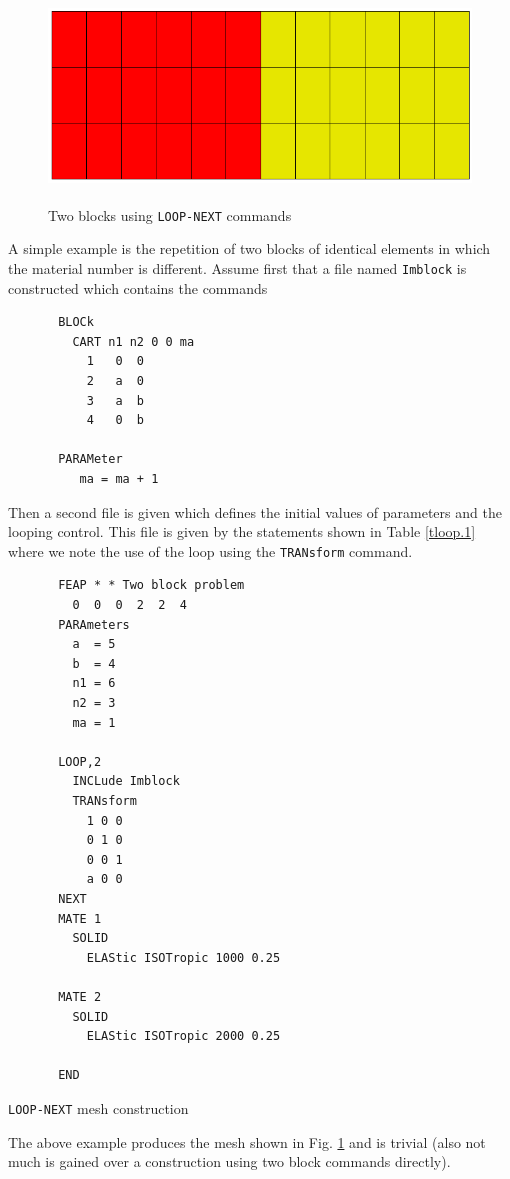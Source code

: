 \begin{figure}[hb!]
\centerline {\hfil \includegraphics[height=2.2in]{figs/lp2blk} \hfil}
\caption{Two blocks using \texttt{LOOP-NEXT} commands \label{floop0}}
\end{figure}
A simple example is the repetition of two blocks of identical elements
in which the material number is different.  Assume first that a file
named \texttt{Imblock} is constructed which contains the commands
\begin{verbatim}
       BLOCk
         CART n1 n2 0 0 ma
           1   0  0
           2   a  0
           3   a  b
           4   0  b

       PARAMeter
          ma = ma + 1

\end{verbatim}
Then a second file is given which defines the initial values of parameters
and the looping control.  This file is given by the statements shown in
Table \ref{tloop.1}
where we note the use of the loop using the \texttt{TRANsform} command.
\begin{table}[ht!]
\begin{center}
\begin{verbatim}
       FEAP * * Two block problem
         0  0  0  2  2  4
       PARAmeters
         a  = 5
         b  = 4
         n1 = 6
         n2 = 3
         ma = 1
 
       LOOP,2
         INCLude Imblock
         TRANsform
           1 0 0
           0 1 0
           0 0 1
           a 0 0
       NEXT
       MATE 1
         SOLID
           ELAStic ISOTropic 1000 0.25

       MATE 2
         SOLID
           ELAStic ISOTropic 2000 0.25

       END
\end{verbatim}
\caption{\texttt{LOOP-NEXT} mesh construction \label{tloop.1}}
\end{center}
\end{table}
The above example produces the mesh shown in Fig. \ref{floop0} and
is trivial (also not much is gained over a construction
using two block commands directly).

